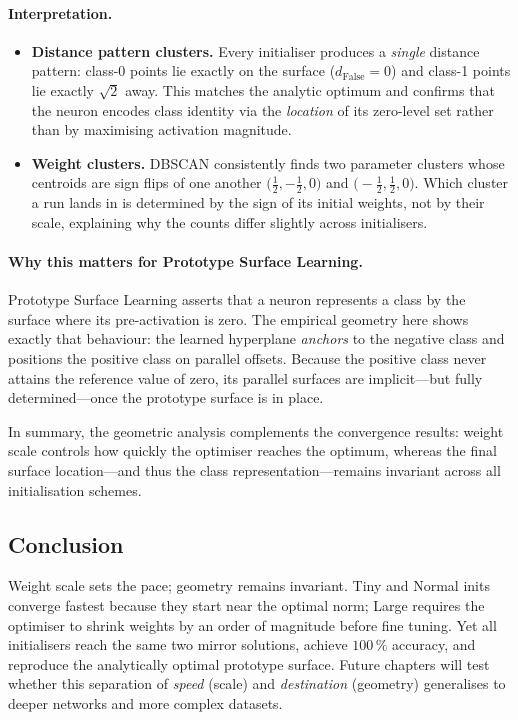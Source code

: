 \paragraph{Interpretation.}
\begin{itemize}
    \item \textbf{Distance pattern clusters.}  
          Every initialiser produces a \emph{single} distance pattern:
          class-0 points lie exactly on the surface
          ($d_{\text{False}}\!=\!0$) and class-1 points lie exactly
          $\sqrt2$ away.  This matches the analytic optimum and confirms that
          the neuron encodes class identity via the \emph{location} of its
          zero-level set rather than by maximising activation magnitude.
    \item \textbf{Weight clusters.}  
          DBSCAN consistently finds two parameter clusters whose centroids are
          sign flips of one another
          \(\bigl(\tfrac12,-\tfrac12,0\bigr)\) and
          \(\bigl(-\tfrac12,\tfrac12,0\bigr)\).
          Which cluster a run lands in is determined by the sign of its
          initial weights, not by their scale, explaining why the counts
          differ slightly across initialisers.
\end{itemize}

\paragraph{Why this matters for Prototype Surface Learning.}
Prototype Surface Learning asserts that a neuron represents a class by the
surface where its pre-activation is zero.  
The empirical geometry here shows exactly that behaviour: the learned
hyperplane \emph{anchors} to the negative class and positions the positive
class on parallel offsets.  
Because the positive class never attains the reference value of zero, its
parallel surfaces are implicit—but fully determined—once the prototype
surface is in place.

In summary, the geometric analysis complements the convergence results: weight
scale controls how quickly the optimiser reaches the optimum, whereas the
final surface location—and thus the class representation—remains invariant
across all initialisation schemes.

\subsection*{Conclusion}

Weight scale sets the pace; geometry remains invariant.  Tiny and Normal
inits converge fastest because they start near the optimal norm; Large
requires the optimiser to shrink weights by an order of magnitude before fine
tuning.  Yet all initialisers reach the same two mirror solutions, achieve
$100\,\%$ accuracy, and reproduce the analytically optimal prototype surface.
Future chapters will test whether this separation of \emph{speed} (scale) and
\emph{destination} (geometry) generalises to deeper networks and more complex
datasets.



